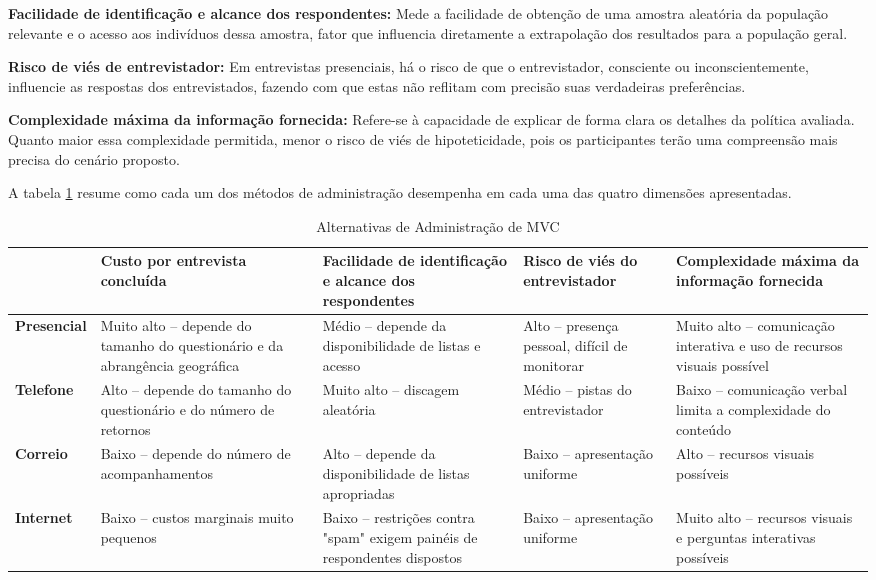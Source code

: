 \documentclass[12pt,letterpaper]{article}
\newcommand{\1}{\mathbbm{1}}
\numberwithin{equation}{section}
\begin{document}
\textbf{Facilidade de identificação e alcance dos respondentes:} Mede a facilidade de obtenção de uma amostra aleatória da população relevante e o acesso aos indivíduos dessa amostra, fator que influencia diretamente a extrapolação dos resultados para a população geral.

\textbf{Risco de viés de entrevistador:} Em entrevistas presenciais, há o risco de que o entrevistador, consciente ou inconscientemente, influencie as respostas dos entrevistados, fazendo com que estas não reflitam com precisão suas verdadeiras preferências.

\textbf{Complexidade máxima da informação fornecida:} Refere-se à capacidade de explicar de forma clara os detalhes da política avaliada. Quanto maior essa complexidade permitida, menor o risco de viés de hipoteticidade, pois os participantes terão uma compreensão mais precisa do cenário proposto.

A tabela \ref{tab:metodo_adm_mvc} resume como cada um dos métodos de administração desempenha em cada uma das quatro dimensões apresentadas.

\begin{table}[h]
    \centering
    \caption{Alternativas de Administração de MVC}
    \begin{adjustbox}{max width=0.95\textwidth,max totalheight=0.95\textheight,keepaspectratio,center}
    \begin{tabular}{l p{3.5cm} p{3.5cm} p{3.5cm} p{3.5cm}}
        \toprule
        & \textbf{Custo por entrevista concluída} & \textbf{Facilidade de identificação e alcance dos respondentes} & \textbf{Risco de viés do entrevistador} & \textbf{Complexidade máxima da informação fornecida} \\
        \midrule
        \textbf{Presencial} & Muito alto – depende do tamanho do questionário e da abrangência geográfica & Médio – depende da disponibilidade de listas e acesso & Alto – presença pessoal, difícil de monitorar & Muito alto – comunicação interativa e uso de recursos visuais possível \\
        \textbf{Telefone} & Alto – depende do tamanho do questionário e do número de retornos & Muito alto – discagem aleatória & Médio – pistas do entrevistador & Baixo – comunicação verbal limita a complexidade do conteúdo \\
        \textbf{Correio} & Baixo – depende do número de acompanhamentos & Alto – depende da disponibilidade de listas apropriadas & Baixo – apresentação uniforme & Alto – recursos visuais possíveis \\
        \textbf{Internet} & Baixo – custos marginais muito pequenos & Baixo – restrições contra "spam" exigem painéis de respondentes dispostos & Baixo – apresentação uniforme & Muito alto – recursos visuais e perguntas interativas possíveis \\
        \bottomrule
    \end{tabular}
    \end{adjustbox}
    \label{tab:metodo_adm_mvc}
\end{table}
\end{document}
